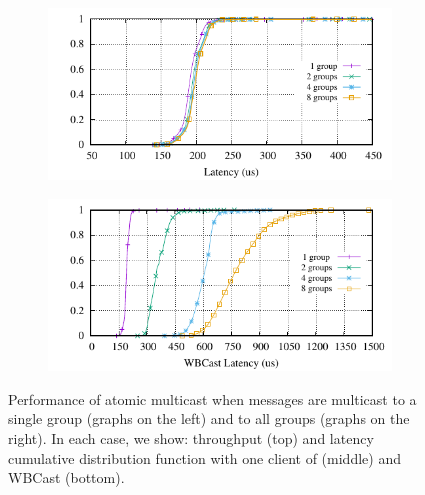 \begin{figure}[ht]
  \begin{subfigure}{\columnwidth}
    \centering
    \includegraphics[width=0.95\columnwidth]{figures/benchmark/graphs/figure-genuine-compare-latency-cdf-wbcast}
  \end{subfigure}
  \begin{subfigure}{\columnwidth}
    \centering
    \includegraphics[width=0.95\columnwidth]{figures/benchmark/graphs/figure-multi-dest-compare-latency-cdf-WBCast}
  \end{subfigure}
  \caption{Performance of atomic multicast when messages are multicast to a single group (graphs on the left) and to all groups (graphs on the right). In each case, we show: throughput (top) and latency cumulative distribution function with one client of \libname (middle) and WBCast (bottom).}
  \label{fig:multicast-single-multi-group}
\end{figure}

